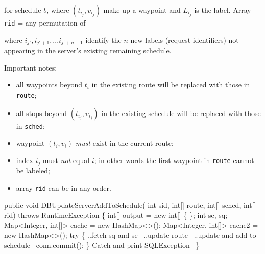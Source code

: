 \documentclass{article}
\theoremstyle{definition}
\begin{document}
\noindent for schedule $b$, where $(t_{i_j},v_{i_j})$ make up a waypoint and
$L_{i_j}$ is the label. Array {\tt{}rid} = any permutation of

\noindent
{}

\noindent where $i_{j'},i_{j'+1},...i_{j'+n-1}$ identify the $n$ new labels
(request identifiers) not appearing in the server's existing remaining
schedule.

Important notes:
\begin{itemize}
\item all waypoints beyond $t_i$ in the existing route will be replaced with
those in {\tt{}route};
\item all stops beyond $(t_{i_j},v_{i_j})$ in the existing schedule will be
replaced with those in {\tt{}sched};
\item waypoint $(t_i,v_i)$ \emph{must} exist in the current route;
\item index $i_j$ must \emph{not} equal $i$; in other words the first waypoint
in {\tt{}route} cannot be labeled;
\item array {\tt{}rid} can be in any order.
\end{itemize}
\nwenddocs{}\endmoddef{}
public void DBUpdateServerAddToSchedule(
    int sid, int[] route, int[] sched, int[] rid)
throws RuntimeException \{
  int[] output = new int[] \{ \};
  int se, sq;
  Map<Integer, int[]> cache = new HashMap<>();
  Map<Integer, int[]> cache2 = new HashMap<>();
  try \{
    \LA{}..fetch \code{}sq\edoc{} and \code{}se\edoc{}~{\nwtagstyle{}}\RA{}
    \LA{}..update route~{\nwtagstyle{}}\RA{}
    \LA{}..update and add to schedule~{\nwtagstyle{}}\RA{}
    conn.commit();
  \}
  \LA{}Catch and print \code{}SQLException\edoc{}~{\nwtagstyle{}}\RA{}
\}
\eatline
\end{document}
